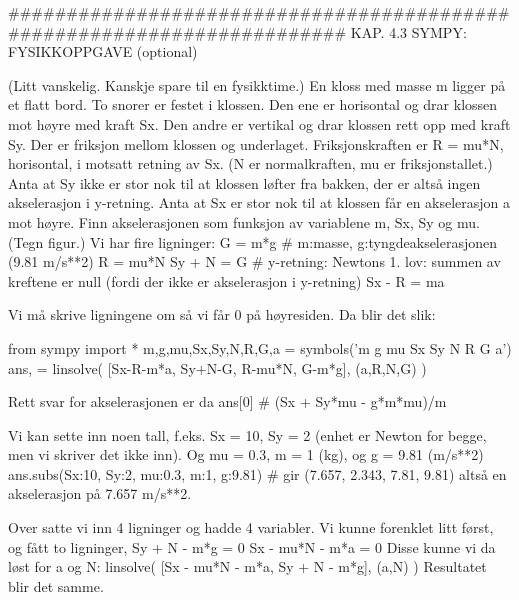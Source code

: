 ######################################################################## 
KAP. 4.3  SYMPY: FYSIKKOPPGAVE  (optional)

(Litt vanskelig. Kanskje spare til en fysikktime.) 
En kloss med masse m ligger på et flatt bord. 
To snorer er festet i klossen.
Den ene er horisontal og drar klossen mot høyre med kraft Sx.
Den andre er vertikal og drar klossen rett opp med kraft Sy.
Der er friksjon mellom klossen og underlaget.
Friksjonskraften er R = mu*N, horisontal, i motsatt retning av Sx.
(N er normalkraften, mu er friksjonstallet.) 
Anta at Sy ikke er stor nok til at klossen løfter fra bakken, der er altså ingen akselerasjon i y-retning.
Anta at Sx er stor nok til at klossen får en akselerasjon a mot høyre. 
Finn akselerasjonen som funksjon av variablene m, Sx, Sy og mu. 
(Tegn figur.) 
Vi har fire ligninger:
G = m*g       # m:masse, g:tyngdeakselerasjonen (9.81 m/s**2)
R = mu*N      
Sy + N = G    # y-retning: Newtons 1. lov: summen av kreftene er null (fordi der ikke er akselerasjon i y-retning)
Sx - R = ma

Vi må skrive ligningene om så vi får 0 på høyresiden. 
Da blir det slik:

from sympy import *
m,g,mu,Sx,Sy,N,R,G,a = symbols('m g mu Sx Sy N R G a')
ans, = linsolve( [Sx-R-m*a, Sy+N-G, R-mu*N, G-m*g], (a,R,N,G) )

Rett svar for akselerasjonen er da
ans[0]        # (Sx + Sy*mu - g*m*mu)/m

Vi kan sette inn noen tall, f.eks. Sx = 10, Sy = 2 (enhet er Newton for begge, men vi skriver det ikke inn).
Og mu = 0.3, m = 1 (kg), og g = 9.81 (m/s**2)
ans.subs({Sx:10, Sy:2, mu:0.3, m:1, g:9.81})   # gir (7.657, 2.343, 7.81, 9.81)
altså en akselerasjon på 7.657 m/s**2.



Over satte vi inn 4 ligninger og hadde 4 variabler.
Vi kunne forenklet litt først, og fått to ligninger,
Sy + N - m*g = 0
Sx - mu*N - m*a = 0
Disse kunne vi da løst for a og N:
linsolve( [Sx - mu*N - m*a, Sy + N - m*g], (a,N) )
Resultatet blir det samme. 
